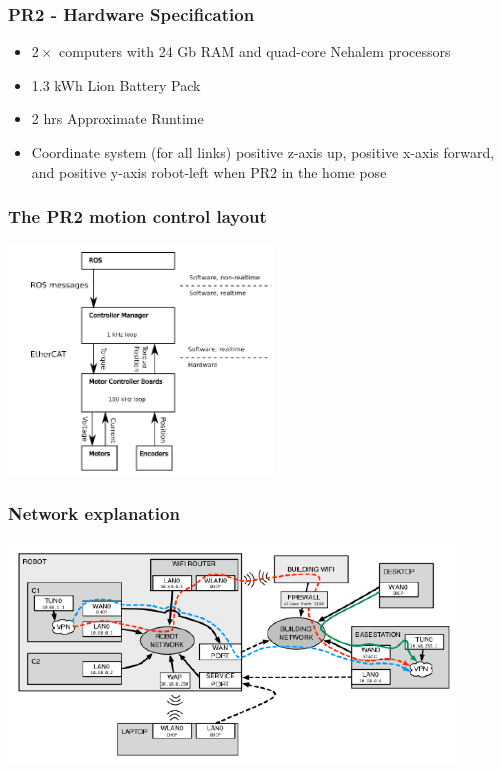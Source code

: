 \documentclass[t]{beamer}
\begin{document}
\begin{frame}
  \frametitle{PR2 - Hardware Specification}
\begin{itemize}
    \item $2\times$ computers with 24 Gb RAM and quad-core Nehalem processors
    \item 1.3 kWh Lion Battery Pack
    \item 2 hrs Approximate Runtime
    \item Coordinate system (for all links) positive z-axis up, positive x-axis forward, and positive y-axis robot-left when PR2 in the home pose
    
\end{itemize}
\end{frame}


\begin{frame}
  \frametitle{The PR2 motion control layout}
\hspace{15ex}\includegraphics[width=7cm]{img/motion_control.png} 
\end{frame}

\begin{frame}
  \frametitle{Network explanation}
\includegraphics[width=12cm]{img/network.png} 
\end{frame}
\end{document}
